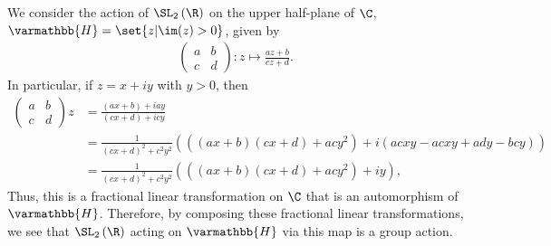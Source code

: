 \documentclass[10pt]{mypackage}
\renewcommand*{\mathbb}[1]{\varmathbb{#1}}
\begin{document}
\begin{solution}
  We consider the action of $\SL_{2}\left( \R \right)$ on the upper half-plane of $\C$, $ \mathbb{H} = \set{z | \im(z) > 0} $, given by
  \begin{align*}
    \begin{pmatrix}a & b \\ c & d\end{pmatrix}\colon z\mapsto \frac{az + b}{cz + d}.
  \end{align*}
  In particular, if $z = x + iy$ with $y > 0$, then
  \begin{align*}
    \begin{pmatrix}a & b \\ c & d\end{pmatrix} z &= \frac{\left( ax + b \right) + iay}{\left( cx + d \right) + icy}\\
                     &= \frac{1}{\left( cx + d \right)^2 + c^2y^2} \left( \left( \left( ax + b \right)\left( cx + d \right) + acy^2 \right) + i\left( acxy - acxy + ady - bcy \right) \right)\\
                     &= \frac{1}{\left( cx + d \right)^2 + c^2y^2}\left( \left( \left( ax + b \right)\left( cx + d \right) + acy^2 \right) + iy \right),
  \end{align*}
  Thus, this is a fractional linear transformation on $\C$ that is an automorphism of $ \mathbb{H} $. Therefore, by composing these fractional linear transformations, we see that $\SL_2\left( \R \right)$ acting on $ \mathbb{H} $ via this map is a group action.\newline


\end{solution}
\end{document}
